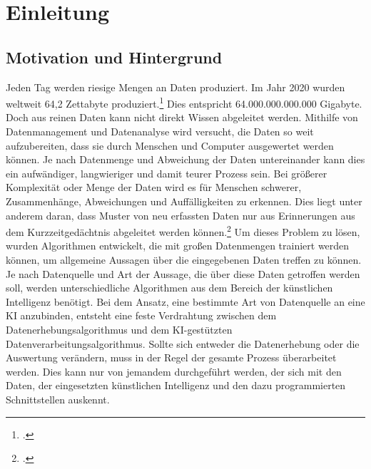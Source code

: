 \section{Einleitung}
\subsection{Motivation und Hintergrund}
Jeden Tag werden riesige Mengen an Daten produziert. Im Jahr 2020 wurden weltweit
64,2 Zettabyte produziert.\footcite{statista2022daten} Dies entspricht 64.000.000.000.000 Gigabyte. Doch aus reinen Daten kann nicht direkt Wissen abgeleitet werden. Mithilfe von Datenmanagement und Datenanalyse wird versucht, die Daten so weit aufzubereiten, dass sie durch Menschen und Computer ausgewertet werden können. Je nach Datenmenge und Abweichung der Daten untereinander kann dies ein aufwändiger, langwieriger und damit teurer Prozess sein. Bei größerer Komplexität oder Menge der Daten wird es für Menschen schwerer, Zusammenhänge, Abweichungen und Auffälligkeiten zu erkennen. Dies liegt unter anderem daran, dass Muster von neu erfassten Daten nur aus Erinnerungen aus dem Kurzzeitgedächtnis abgeleitet werden können.\footcite{snyder2000music} Um dieses Problem zu lösen, wurden Algorithmen entwickelt, die mit großen Datenmengen trainiert werden können, um allgemeine Aussagen über die eingegebenen Daten treffen zu können. Je nach Datenquelle und Art der Aussage, die über diese Daten getroffen werden soll, werden unterschiedliche Algorithmen aus dem Bereich der künstlichen Intelligenz benötigt. Bei dem Ansatz, eine bestimmte Art von Datenquelle an eine KI anzubinden, entsteht eine feste Verdrahtung zwischen dem Datenerhebungsalgorithmus und dem KI-gestützten Datenverarbeitungsalgorithmus. Sollte sich entweder die Datenerhebung oder die Auswertung verändern, muss in der Regel der gesamte Prozess überarbeitet werden. Dies kann nur von jemandem durchgeführt werden, der sich mit den Daten, der eingesetzten künstlichen Intelligenz und den dazu programmierten Schnittstellen auskennt.

